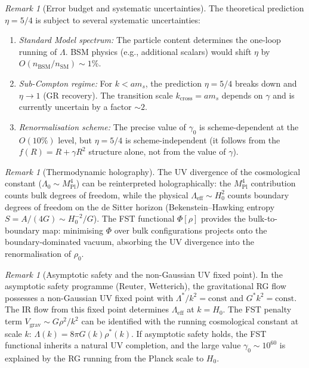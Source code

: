 \documentclass[12pt,a4paper]{article}
\theoremstyle{definition}
\theoremstyle{plain}
\theoremstyle{remark}
\newtheorem{remark}[definition]{Remark}
\begin{document}
\begin{remark}[Error budget and systematic uncertainties]
\label{rem:error-budget}
The theoretical prediction $\eta = 5/4$ is subject to several systematic uncertainties:
\begin{enumerate}
\item \emph{Standard Model spectrum:} The particle content determines the one-loop running of $\Lambda$. BSM physics (e.g., additional scalars) would shift $\eta$ by $O(n_{\mathrm{BSM}}/n_{\mathrm{SM}}) \sim 1\%$.
\item \emph{Sub-Compton regime:} For $k < a m_s$, the prediction $\eta = 5/4$ breaks down and $\eta \to 1$ (GR recovery). The transition scale $k_{\mathrm{cross}} = a m_s$ depends on $\gamma$ and is currently uncertain by a factor $\sim 2$.
\item \emph{Renormalisation scheme:} The precise value of $\gamma_0$ is scheme-dependent at the $O(10\%)$ level, but $\eta = 5/4$ is scheme-independent (it follows from the $f(R) = R + \gamma R^2$ structure alone, not from the value of $\gamma$).
\end{enumerate}
\end{remark}

\begin{remark}[Thermodynamic holography]
\label{rem:thermo-holography}
The UV divergence of the cosmological constant ($\Lambda_0 \sim M_{\mathrm{Pl}}^4$) can be reinterpreted holographically: the $M_{\mathrm{Pl}}^4$ contribution counts bulk degrees of freedom, while the physical $\Lambda_{\mathrm{eff}} \sim H_0^2$ counts boundary degrees of freedom on the de Sitter horizon (Bekenstein--Hawking entropy $S = A/(4G) \sim H_0^{-2}/G$). The FST functional $\Phi[\rho]$ provides the bulk-to-boundary map: minimising $\Phi$ over bulk configurations projects onto the boundary-dominated vacuum, absorbing the UV divergence into the renormalisation of $\rho_0$.
\end{remark}

\begin{remark}[Asymptotic safety and the non-Gaussian UV fixed point]
\label{rem:asymptotic-safety-uv}
In the asymptotic safety programme (Reuter, Wetterich), the gravitational RG flow possesses a non-Gaussian UV fixed point with $\Lambda^* / k^2 = \mathrm{const}$ and $G^* k^2 = \mathrm{const}$. The IR flow from this fixed point determines $\Lambda_{\mathrm{eff}}$ at $k = H_0$. The FST penalty term $V_{\mathrm{grav}} \sim G \rho^2 / k^2$ can be identified with the running cosmological constant at scale $k$: $\Lambda(k) = 8\pi G(k) \rho^*(k)$. If asymptotic safety holds, the FST functional inherits a natural UV completion, and the large value $\gamma_0 \sim 10^{60}$ is explained by the RG running from the Planck scale to $H_0$.
\end{remark}
\end{document}
